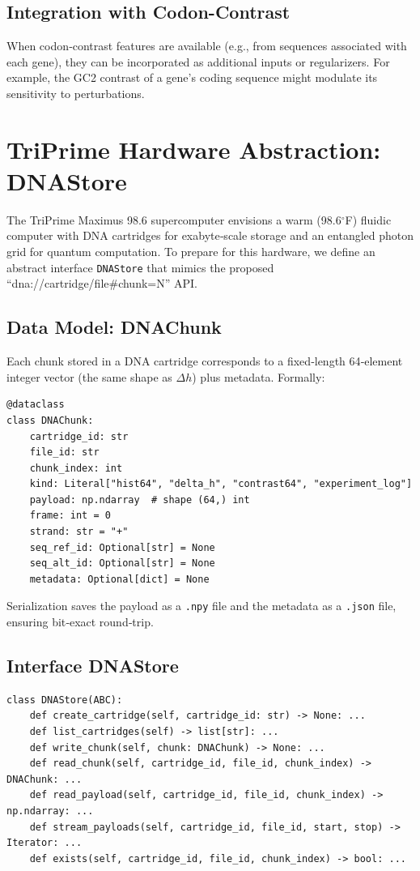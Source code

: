 \documentclass[12pt]{article}
\begin{document}
\subsection{Integration with Codon-Contrast}

When codon‑contrast features are available (e.g., from sequences associated with each gene), they can be incorporated as additional inputs or regularizers. For example, the GC2 contrast of a gene’s coding sequence might modulate its sensitivity to perturbations.

\section{TriPrime Hardware Abstraction: DNAStore}
\label{sec:triprime}

The TriPrime Maximus 98.6 supercomputer \cite{parrott2025} envisions a warm (98.6$^\circ$F) fluidic computer with DNA cartridges for exabyte‑scale storage and an entangled photon grid for quantum computation. To prepare for this hardware, we define an abstract interface \texttt{DNAStore} that mimics the proposed ``dna://cartridge/file\#chunk=N'' API.

\subsection{Data Model: DNAChunk}

Each chunk stored in a DNA cartridge corresponds to a fixed‑length 64‑element integer vector (the same shape as $\Delta h$) plus metadata. Formally:

\begin{verbatim}
@dataclass
class DNAChunk:
    cartridge_id: str
    file_id: str
    chunk_index: int
    kind: Literal["hist64", "delta_h", "contrast64", "experiment_log"]
    payload: np.ndarray  # shape (64,) int
    frame: int = 0
    strand: str = "+"
    seq_ref_id: Optional[str] = None
    seq_alt_id: Optional[str] = None
    metadata: Optional[dict] = None
\end{verbatim}

Serialization saves the payload as a \texttt{.npy} file and the metadata as a \texttt{.json} file, ensuring bit‑exact round‑trip.

\subsection{Interface DNAStore}

\begin{verbatim}
class DNAStore(ABC):
    def create_cartridge(self, cartridge_id: str) -> None: ...
    def list_cartridges(self) -> list[str]: ...
    def write_chunk(self, chunk: DNAChunk) -> None: ...
    def read_chunk(self, cartridge_id, file_id, chunk_index) -> DNAChunk: ...
    def read_payload(self, cartridge_id, file_id, chunk_index) -> np.ndarray: ...
    def stream_payloads(self, cartridge_id, file_id, start, stop) -> Iterator: ...
    def exists(self, cartridge_id, file_id, chunk_index) -> bool: ...
\end{verbatim}
\end{document}
